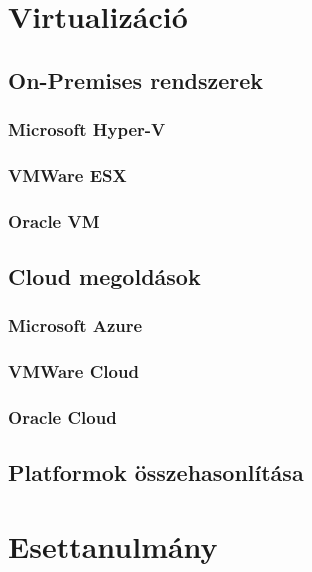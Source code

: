 \documentclass[12pt,oneside,justify]{book}
\begin{document}
 




\tableofcontents

\chapter{Virtualizáció}
\section{On-Premises rendszerek}
\subsection{Microsoft Hyper-V\texttrademark}
\noindent %

\subsection{VMWare ESX \textsuperscript{\textregistered}}
\noindent %

\subsection{Oracle\textsuperscript{\textregistered} VM}
\noindent

\section{Cloud megoldások}
\subsection{Microsoft Azure}
\noindent

\subsection{VMWare Cloud}
\noindent

\subsection{Oracle Cloud}
\noindent

\section{Platformok összehasonlítása}
\noindent

\chapter{Esettanulmány}
\end{document}
